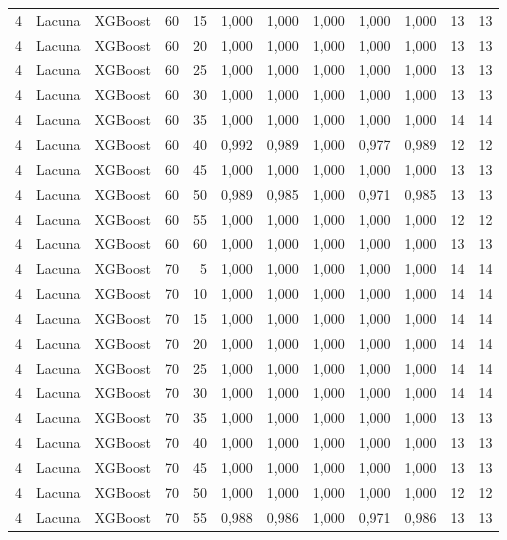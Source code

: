 \begin{longtable}{@{}rllrrrrrrrrr@{}}
4 & Lacuna & XGBoost & 60 & 15 & 1,000 & 1,000 & 1,000 & 1,000 & 1,000 & 13 & 13 \\
4 & Lacuna & XGBoost & 60 & 20 & 1,000 & 1,000 & 1,000 & 1,000 & 1,000 & 13 & 13 \\
4 & Lacuna & XGBoost & 60 & 25 & 1,000 & 1,000 & 1,000 & 1,000 & 1,000 & 13 & 13 \\
4 & Lacuna & XGBoost & 60 & 30 & 1,000 & 1,000 & 1,000 & 1,000 & 1,000 & 13 & 13 \\
4 & Lacuna & XGBoost & 60 & 35 & 1,000 & 1,000 & 1,000 & 1,000 & 1,000 & 14 & 14 \\
4 & Lacuna & XGBoost & 60 & 40 & 0,992 & 0,989 & 1,000 & 0,977 & 0,989 & 12 & 12 \\
4 & Lacuna & XGBoost & 60 & 45 & 1,000 & 1,000 & 1,000 & 1,000 & 1,000 & 13 & 13 \\
4 & Lacuna & XGBoost & 60 & 50 & 0,989 & 0,985 & 1,000 & 0,971 & 0,985 & 13 & 13 \\
4 & Lacuna & XGBoost & 60 & 55 & 1,000 & 1,000 & 1,000 & 1,000 & 1,000 & 12 & 12 \\
4 & Lacuna & XGBoost & 60 & 60 & 1,000 & 1,000 & 1,000 & 1,000 & 1,000 & 13 & 13 \\
4 & Lacuna & XGBoost & 70 & 5 & 1,000 & 1,000 & 1,000 & 1,000 & 1,000 & 14 & 14 \\
4 & Lacuna & XGBoost & 70 & 10 & 1,000 & 1,000 & 1,000 & 1,000 & 1,000 & 14 & 14 \\
4 & Lacuna & XGBoost & 70 & 15 & 1,000 & 1,000 & 1,000 & 1,000 & 1,000 & 14 & 14 \\
4 & Lacuna & XGBoost & 70 & 20 & 1,000 & 1,000 & 1,000 & 1,000 & 1,000 & 14 & 14 \\
4 & Lacuna & XGBoost & 70 & 25 & 1,000 & 1,000 & 1,000 & 1,000 & 1,000 & 14 & 14 \\
4 & Lacuna & XGBoost & 70 & 30 & 1,000 & 1,000 & 1,000 & 1,000 & 1,000 & 14 & 14 \\
4 & Lacuna & XGBoost & 70 & 35 & 1,000 & 1,000 & 1,000 & 1,000 & 1,000 & 13 & 13 \\
4 & Lacuna & XGBoost & 70 & 40 & 1,000 & 1,000 & 1,000 & 1,000 & 1,000 & 13 & 13 \\
4 & Lacuna & XGBoost & 70 & 45 & 1,000 & 1,000 & 1,000 & 1,000 & 1,000 & 13 & 13 \\
4 & Lacuna & XGBoost & 70 & 50 & 1,000 & 1,000 & 1,000 & 1,000 & 1,000 & 12 & 12 \\
4 & Lacuna & XGBoost & 70 & 55 & 0,988 & 0,986 & 1,000 & 0,971 & 0,986 & 13 & 13 \\

\end{longtable}
